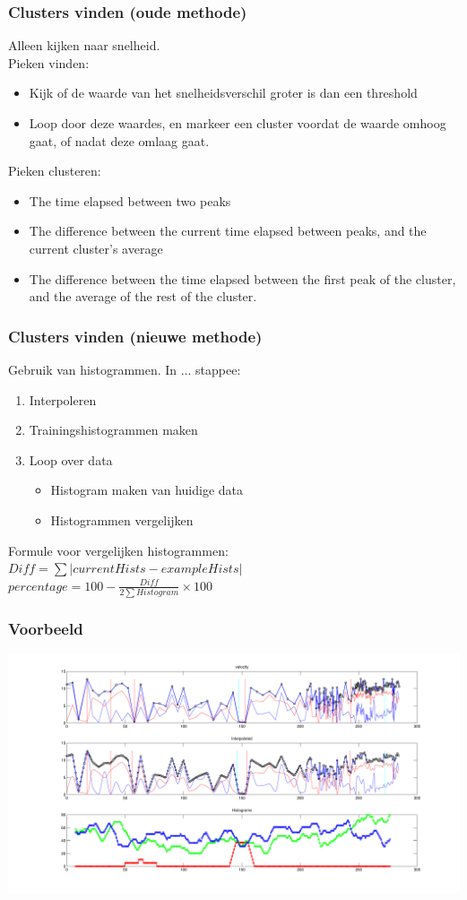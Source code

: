 \documentclass{beamer}
\newcommand{\slide}[2]
{
\begin{frame}
\frametitle{#1} 

#2

\end{frame}
}
\begin{document}
\slide{Clusters vinden (oude methode)}
{
     Alleen kijken naar snelheid.\\
     Pieken vinden:
 \begin{itemize}
    \item Kijk of de waarde van het snelheidsverschil groter is dan een
    threshold
    \item Loop door deze waardes, en markeer een cluster voordat de waarde omhoog
    gaat, of nadat deze omlaag gaat.
 \end{itemize}
    Pieken clusteren:
    \begin{itemize}
 \item The time elapsed between two peaks
 \item The difference between the current time elapsed between peaks, and the
 current cluster's average
 \item The difference between the time elapsed between the first peak of the
 cluster, and the average of the rest of the cluster.
 \end{itemize}

}


\slide{Clusters vinden (nieuwe methode)}
{
    Gebruik van histogrammen. In ... stappee:
\begin{enumerate}
    \item Interpoleren
    \item Trainingshistogrammen maken
    \item Loop over data
    \begin{itemize}
        \item Histogram maken van huidige data
        \item Histogrammen vergelijken
    \end{itemize}
\end{enumerate}

Formule voor vergelijken histogrammen:\\
\hspace{.5cm} $Diff =  \sum \left| currentHists - exampleHists
\right|$\\
\hspace{.5cm} $percentage = 100 - \frac{Diff}{2 \sum Histogram} \times 100$
}

\begin{frame}
\frametitle{Voorbeeld}
\includegraphics[width=\textwidth]{clustering.pdf}
\end{frame}
\end{document}
